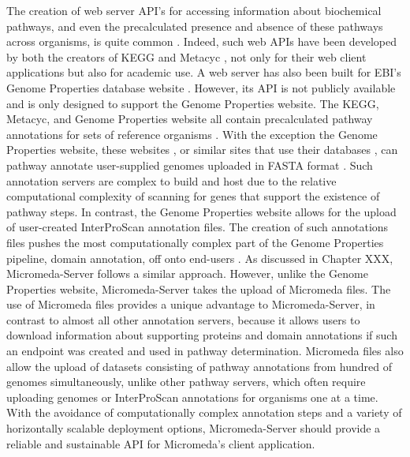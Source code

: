 The creation of web server API's for accessing information about biochemical pathways, and even the precalculated presence and absence of these pathways across organisms, is quite common \cite{wu2006kobas,moriya2010pathpred,pireddu2006path,vallenet2009microscope,aziz2008rast,takami2016automated,moriya2007kaas,chou2009fmm}. Indeed, such web APIs have been developed by both the creators of KEGG \cite{kawashima2003kegg} and Metacyc \cite{karp2013data}, not only for their web client applications but also for academic use. A web server has also been built for EBI's Genome Properties database website \cite{richardson2018genome}. However, its API is not publicly available and is only designed to support the Genome Properties website. The KEGG, Metacyc, and Genome Properties website all contain precalculated pathway annotations for sets of reference organisms \cite{kanehisa2000kegg,karp2002metacyc,karp2013data}. With the exception the Genome Properties website, these websites \cite{kanehisa2016blastkoala}, or similar sites that use their databases \cite{chou2009fmm,moriya2007kaas,takami2016automated}, can pathway annotate user-supplied genomes uploaded in FASTA format \cite{pearson19905}. Such annotation servers are complex to build and host due to the relative computational complexity of scanning for genes that support the existence of pathway steps. In contrast, the Genome Properties website allows for the upload of user-created InterProScan annotation files. The creation of such annotations files pushes the most computationally complex part of the Genome Properties pipeline, domain annotation, off onto end-users \cite{richardson2018genome}. As discussed in Chapter XXX, Micromeda-Server follows a similar approach. However, unlike the Genome Properties website, Micromeda-Server takes the upload of Micromeda files. The use of Micromeda files provides a unique advantage to Micromeda-Server, in contrast to almost all other annotation servers, because it allows users to download information about supporting proteins and domain annotations if such an endpoint was created and used in pathway determination. Micromeda files also allow the upload of datasets consisting of pathway annotations from hundred of genomes simultaneously, unlike other pathway servers, which often require uploading genomes or InterProScan annotations for organisms one at a time. With the avoidance of computationally complex annotation steps and a variety of horizontally scalable deployment options, Micromeda-Server should provide a reliable and sustainable API for Micromeda's client application.
